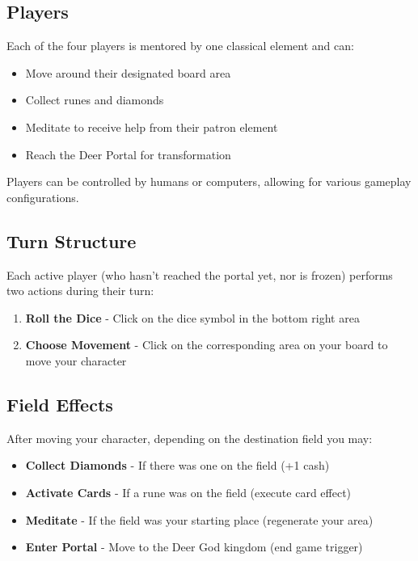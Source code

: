 \documentclass[12pt,a4paper]{article}
\begin{document}
\subsection{Players}
Each of the four players is mentored by one classical element and can:
\begin{itemize}
    \item Move around their designated board area
    \item Collect runes and diamonds
    \item Meditate to receive help from their patron element
    \item Reach the Deer Portal for transformation
\end{itemize}

Players can be controlled by humans or computers, allowing for various gameplay configurations.

\subsection{Turn Structure}
Each active player (who hasn't reached the portal yet, nor is frozen) performs two actions during their turn:

\begin{enumerate}
    \item \textbf{Roll the Dice} - Click on the dice symbol in the bottom right area
    \item \textbf{Choose Movement} - Click on the corresponding area on your board to move your character
\end{enumerate}

\subsection{Field Effects}
After moving your character, depending on the destination field you may:

\begin{itemize}
    \item \textbf{Collect Diamonds} - If there was one on the field (+1 cash)
    \item \textbf{Activate Cards} - If a rune was on the field (execute card effect)
    \item \textbf{Meditate} - If the field was your starting place (regenerate your area)
    \item \textbf{Enter Portal} - Move to the Deer God kingdom (end game trigger)
\end{itemize}
\end{document}
